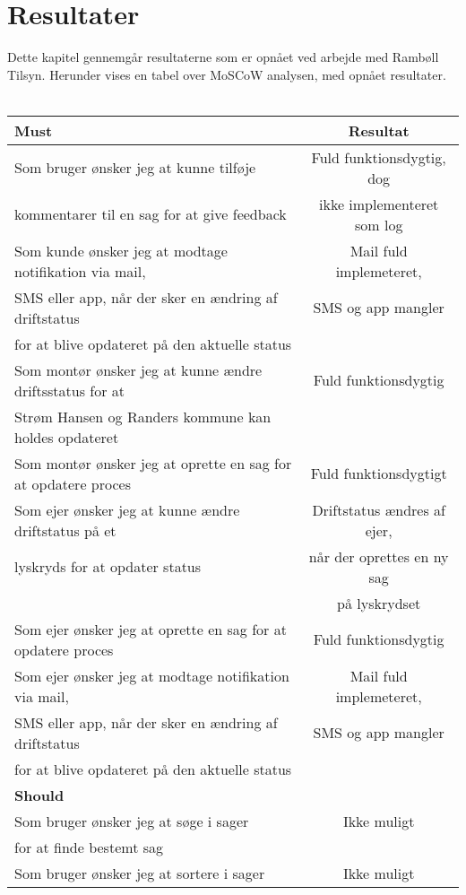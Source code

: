 \chapter{Resultater}
Dette kapitel gennemgår resultaterne som er opnået ved arbejde med Rambøll Tilsyn. Herunder vises en tabel over MoSCoW analysen, med opnået resultater.\\ \\
\begin{tabular}{ l | c  }
	\hline
	\textbf{Must} & \textbf{Resultat} \\ \hline
	Som bruger ønsker jeg at kunne tilføje & Fuld funktionsdygtig, dog\\
	kommentarer til en sag for at give feedback & ikke implementeret som log\\ 
	\hline
	Som kunde ønsker jeg at modtage notifikation via mail, & Mail fuld implemeteret,\\
	SMS eller app, når der sker en ændring af driftstatus & SMS og app mangler\\
	for at blive opdateret på den aktuelle status & \\
	\hline
	Som montør ønsker jeg at kunne ændre driftsstatus for at & Fuld funktionsdygtig\\
	Strøm Hansen og Randers kommune kan holdes opdateret & \\
	\hline
	Som montør ønsker jeg at oprette en sag for at opdatere proces & Fuld funktionsdygtigt\\
	\hline
	Som ejer ønsker jeg at kunne ændre driftstatus på et & Driftstatus ændres af ejer,\\
	lyskryds for at opdater status & når der oprettes en ny sag\\
	 & på lyskrydset\\
	\hline
	Som ejer ønsker jeg at oprette en sag for at opdatere proces & Fuld funktionsdygtig\\
	\hline
	Som ejer ønsker jeg at modtage notifikation via mail, & Mail fuld implemeteret,\\
	SMS eller app, når der sker en ændring af driftstatus & SMS og app mangler\\
	for at blive opdateret på den aktuelle status &\\ 
	\hline
	\textbf{Should} & \\ \hline
	Som bruger ønsker jeg at søge i sager & Ikke muligt\\
	for at finde bestemt sag &\\
	\hline
	Som bruger ønsker jeg at sortere i sager & Ikke muligt\\

\end{tabular}
